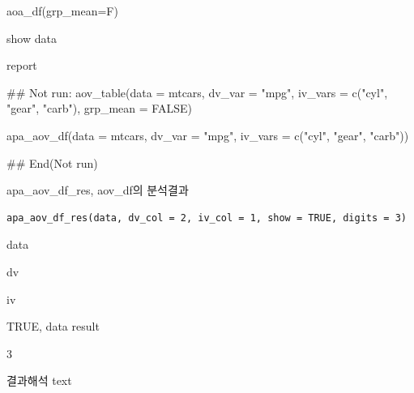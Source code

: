 \documentclass[a4paper]{book}
\begin{document}
%
\begin{Arguments}
\begin{ldescription}
\item[\code{data}] aoa\_df(grp\_mean=F)

\item[\code{show}] show data
\end{ldescription}
\end{Arguments}
%
\begin{Value}
report
\end{Value}
%
\begin{Examples}
\begin{ExampleCode}
## Not run: 
aov_table(data = mtcars, dv_var = "mpg",
iv_vars = c("cyl", "gear", "carb"),
grp_mean = FALSE)%

apa_aov_df(data = mtcars, dv_var = "mpg",
 iv_vars = c("cyl", "gear", "carb"))

## End(Not run)


\end{ExampleCode}
\end{Examples}
%
\begin{Description}
apa\_aov\_df\_res, aov\_df의 분석결과
\end{Description}
%
\begin{Usage}
\begin{verbatim}
apa_aov_df_res(data, dv_col = 2, iv_col = 1, show = TRUE, digits = 3)
\end{verbatim}
\end{Usage}
%
\begin{Arguments}
\begin{ldescription}
\item[\code{data}] data

\item[\code{dv\_col}] dv

\item[\code{iv\_col}] iv

\item[\code{show}] TRUE, data result

\item[\code{digits}] 3
\end{ldescription}
\end{Arguments}
%
\begin{Value}
결과해석 text
\end{Value}
%
\end{document}
